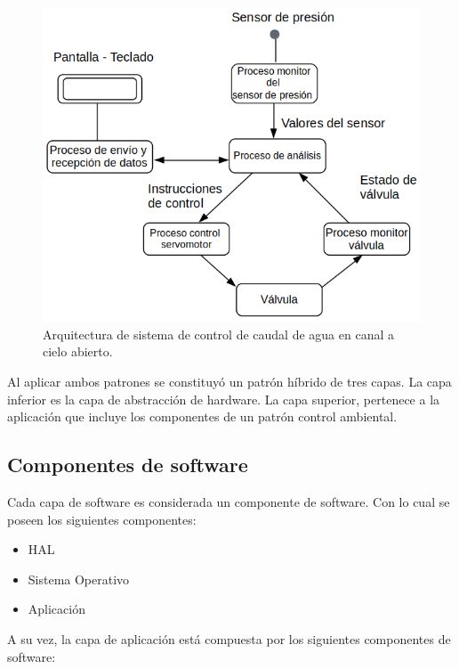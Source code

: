 \begin{figure}[htpb]
\centering
\includegraphics[scale=.65]{./Figures/ArquitecturaSoftware.png}
\caption{Arquitectura de sistema de control de caudal de agua en canal a cielo abierto.}
\label{fig:Arquitectura de software}
\end{figure}

Al aplicar ambos patrones se constituyó un patrón híbrido de tres capas. La capa inferior es la capa de abstracción de hardware. La capa superior, pertenece a la aplicación que incluye los componentes de un patrón control ambiental.


\subsection{Componentes de software}
\label{subsec:Componentes de software}
Cada capa de software es considerada un componente de software. Con lo cual se poseen los siguientes componentes:

\begin{itemize}
\item HAL
\item Sistema Operativo
\item Aplicación
\end{itemize}
\vspace{1cm}
A su vez, la capa de aplicación está compuesta por los siguientes componentes de software:

